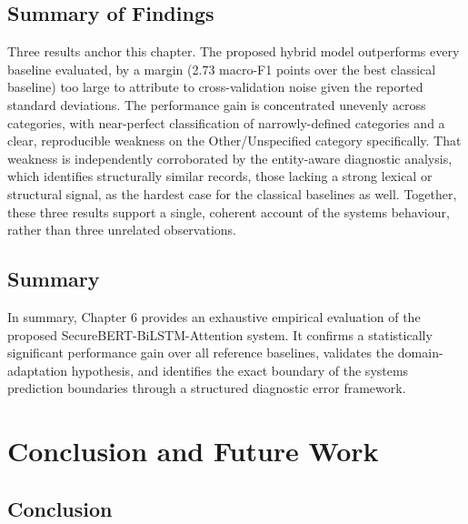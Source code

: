 \documentclass[12pt,a4paper]{report}
\begin{document}
\section{Summary of Findings}

Three results anchor this chapter. The proposed hybrid model outperforms
every baseline evaluated, by a margin (2.73 macro-F1 points over the
best classical baseline) too large to attribute to cross-validation
noise given the reported standard deviations. The performance gain is
concentrated unevenly across categories, with near-perfect
classification of narrowly-defined categories and a clear, reproducible
weakness on the Other/Unspecified category specifically. That weakness
is independently corroborated by the entity-aware diagnostic analysis,
which identifies structurally similar records, those lacking a strong
lexical or structural signal, as the hardest case for the classical
baselines as well. Together, these three results support a single,
coherent account of the system\textquotesingle s behaviour, rather than
three unrelated observations.
\section{Summary}\label{summary-3}

In summary, Chapter 6 provides an exhaustive empirical evaluation of the
proposed SecureBERT-BiLSTM-Attention system. It confirms a statistically
significant performance gain over all reference baselines, validates the
domain-adaptation hypothesis, and identifies the exact boundary of the
system\textquotesingle s prediction boundaries through a structured
diagnostic error framework.

\chapter{Conclusion and Future Work}
\section{Conclusion}
\end{document}
